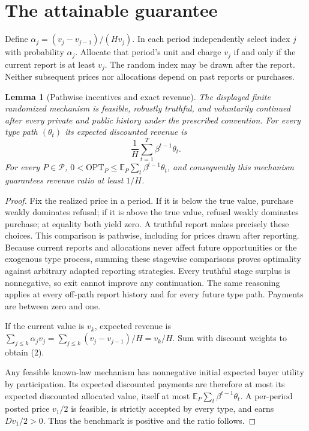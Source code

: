 \documentclass[11pt]{article}
\newtheorem{lemma}[theorem]{Lemma}
\theoremstyle{remark}\newtheorem{remark}[theorem]{Remark}
\newcommand{\E}{\mathbb E}
\begin{document}
\section*{The attainable guarantee}
Define $\alpha_j=(v_j-v_{j-1})/(Hv_j)$. In each period independently select index $j$ with probability $\alpha_j$. Allocate that period's unit and charge $v_j$ if and only if the current report is at least $v_j$. The random index may be drawn after the report. Neither subsequent prices nor allocations depend on past reports or purchases.

\begin{lemma}[Pathwise incentives and exact revenue]\label{lem:lower}
The displayed finite randomized mechanism is feasible, robustly truthful, and voluntarily continued after every private and public history under the prescribed convention. For every type path $(\theta_t)$ its expected discounted revenue is
\[
 \frac1H\sum_{t=1}^T\beta^{t-1}\theta_t.                         \tag{2}
\]
For every $P\in\mathcal P$, $0<\mathrm{OPT}_P\leq\E_P\sum_t\beta^{t-1}\theta_t$, and consequently this mechanism guarantees revenue ratio at least $1/H$.
\end{lemma}
\begin{proof}
Fix the realized price in a period. If it is below the true value, purchase weakly dominates refusal; if it is above the true value, refusal weakly dominates purchase; at equality both yield zero. A truthful report makes precisely these choices. This comparison is pathwise, including for prices drawn after reporting. Because current reports and allocations never affect future opportunities or the exogenous type process, summing these stagewise comparisons proves optimality against arbitrary adapted reporting strategies. Every truthful stage surplus is nonnegative, so exit cannot improve any continuation. The same reasoning applies at every off-path report history and for every future type path. Payments are between zero and one.

If the current value is $v_k$, expected revenue is
$\sum_{j\leq k}\alpha_jv_j=\sum_{j\leq k}(v_j-v_{j-1})/H=v_k/H$.
Sum with discount weights to obtain (2).

Any feasible known-law mechanism has nonnegative initial expected buyer utility by participation. Its expected discounted payments are therefore at most its expected discounted allocated value, itself at most $\E_P\sum_t\beta^{t-1}\theta_t$. A per-period posted price $v_1/2$ is feasible, is strictly accepted by every type, and earns $Dv_1/2>0$. Thus the benchmark is positive and the ratio follows.
\end{proof}
\end{document}
